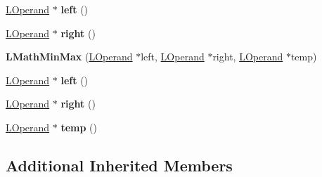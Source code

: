 \begin{DoxyCompactItemize}
\item 
\hyperlink{classv8_1_1internal_1_1_l_operand}{L\+Operand} $\ast$ {\bfseries left} ()\hypertarget{classv8_1_1internal_1_1_l_math_min_max_ab6612b0d7d149b7e7e9294db370713ac}{}\label{classv8_1_1internal_1_1_l_math_min_max_ab6612b0d7d149b7e7e9294db370713ac}

\item 
\hyperlink{classv8_1_1internal_1_1_l_operand}{L\+Operand} $\ast$ {\bfseries right} ()\hypertarget{classv8_1_1internal_1_1_l_math_min_max_a089de7f1ae2f11d85ab445a6cf6e96eb}{}\label{classv8_1_1internal_1_1_l_math_min_max_a089de7f1ae2f11d85ab445a6cf6e96eb}

\item 
{\bfseries L\+Math\+Min\+Max} (\hyperlink{classv8_1_1internal_1_1_l_operand}{L\+Operand} $\ast$left, \hyperlink{classv8_1_1internal_1_1_l_operand}{L\+Operand} $\ast$right, \hyperlink{classv8_1_1internal_1_1_l_operand}{L\+Operand} $\ast$temp)\hypertarget{classv8_1_1internal_1_1_l_math_min_max_ac3766dba41ef23f8f381244fa53a2272}{}\label{classv8_1_1internal_1_1_l_math_min_max_ac3766dba41ef23f8f381244fa53a2272}

\item 
\hyperlink{classv8_1_1internal_1_1_l_operand}{L\+Operand} $\ast$ {\bfseries left} ()\hypertarget{classv8_1_1internal_1_1_l_math_min_max_ab6612b0d7d149b7e7e9294db370713ac}{}\label{classv8_1_1internal_1_1_l_math_min_max_ab6612b0d7d149b7e7e9294db370713ac}

\item 
\hyperlink{classv8_1_1internal_1_1_l_operand}{L\+Operand} $\ast$ {\bfseries right} ()\hypertarget{classv8_1_1internal_1_1_l_math_min_max_a089de7f1ae2f11d85ab445a6cf6e96eb}{}\label{classv8_1_1internal_1_1_l_math_min_max_a089de7f1ae2f11d85ab445a6cf6e96eb}

\item 
\hyperlink{classv8_1_1internal_1_1_l_operand}{L\+Operand} $\ast$ {\bfseries temp} ()\hypertarget{classv8_1_1internal_1_1_l_math_min_max_a3d9f2801c5f51f527b6e1a02de1d693f}{}\label{classv8_1_1internal_1_1_l_math_min_max_a3d9f2801c5f51f527b6e1a02de1d693f}

\end{DoxyCompactItemize}
\subsection*{Additional Inherited Members}


